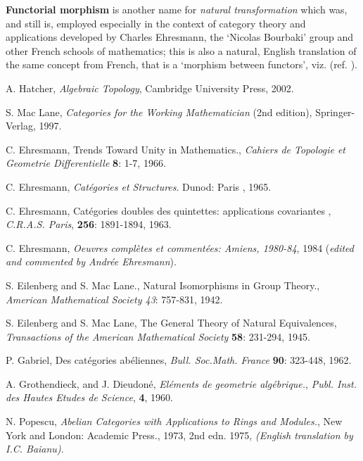 \documentclass[12pt]{article}
\theoremstyle{plain}
\theoremstyle{definition}
\numberwithin{equation}{section}
\begin{document}
\textbf{Functorial morphism} is another name for \emph{natural transformation} which was, and  still is, 
employed especially in the context of category theory and applications developed by Charles Ehresmann, the `Nicolas Bourbaki' group and other French schools of mathematics; this is also a natural, English translation of the same concept from French, that is a `morphism between functors',  viz. (ref. \cite{CE1965}).

\begin{thebibliography}{9}

A. Hatcher, \emph{Algebraic Topology}, Cambridge University Press, 2002.

S. Mac Lane, \emph{Categories for the Working Mathematician} (2nd edition), Springer-Verlag, 1997.

C. Ehresmann, Trends Toward Unity in Mathematics., \emph{Cahiers de Topologie et Geometrie Differentielle}
\textbf{8}: 1-7, 1966.

C. Ehresmann, \emph{Cat\'egories et Structures}. Dunod: Paris , 1965.

C. Ehresmann, Cat\'egories doubles des quintettes: applications covariantes
, \emph{C.R.A.S. Paris}, \textbf{256}: 1891-1894, 1963.

C. Ehresmann, \emph{Oeuvres compl\`etes et  comment\'ees:
Amiens, 1980-84}, 1984 (\emph{edited and commented by Andr\'ee Ehresmann}).


S. Eilenberg and S. Mac Lane.,  Natural Isomorphisms in Group Theory., \emph{American Mathematical Society 43}: 757-831, 1942.

S. Eilenberg and S. Mac Lane,  The General Theory of Natural Equivalences, \emph{Transactions of the American Mathematical Society} \textbf{58}: 231-294, 1945.

P. Gabriel, Des cat\'egories ab\'eliennes, \emph{Bull. Soc.Math. France} 
\textbf{90}: 323-448, 1962.

A. Grothendieck, and J. Dieudon\'{e},  \emph{El\'{e}ments de geometrie alg\'{e}brique.}, \emph{Publ. Inst. des Hautes Etudes de Science}, \textbf{4}, 1960.

N. Popescu, \emph{Abelian Categories with Applications to Rings and Modules.}, New York and London: Academic Press.,
1973, 2nd edn. 1975, \emph{(English translation by I.C. Baianu)}.

\end{thebibliography}
\end{document}
